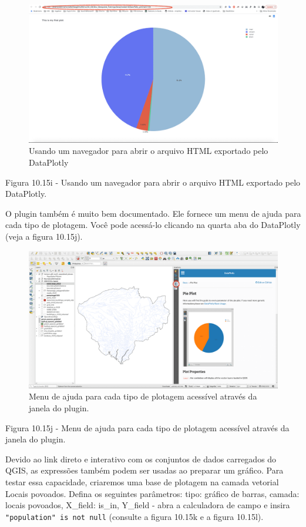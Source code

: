 \documentclass[
]{krantz}
\begin{document}
\begin{figure}
\centering
\includegraphics{media/modulo10/fig1015_i.png}
\caption{Usando um navegador para abrir o arquivo HTML exportado pelo DataPlotly}
\end{figure}

Figura 10.15i - Usando um navegador para abrir o arquivo HTML exportado pelo DataPlotly.

O plugin também é muito bem documentado. Ele fornece um menu de ajuda para cada tipo de plotagem. Você pode acessá-lo clicando na quarta aba do DataPlotly (veja a figura 10.15j).

\begin{figure}
\centering
\includegraphics{media/modulo10/fig1015_j.png}
\caption{Menu de ajuda para cada tipo de plotagem acessível através da janela do plugin.}
\end{figure}

Figura 10.15j - Menu de ajuda para cada tipo de plotagem acessível através da janela do plugin.

Devido ao link direto e interativo com os conjuntos de dados carregados do QGIS, as expressões também podem ser usadas ao preparar um gráfico. Para testar essa capacidade, criaremos uma base de plotagem na camada vetorial Locais povoados. Defina os seguintes parâmetros: tipo: gráfico de barras, camada: locais povoados, X\_field: is\_in, Y\_field - abra a calculadora de campo e insira \texttt{"population"\ is\ not\ null} (consulte a figura 10.15k e a figura 10.15l).
\end{document}
